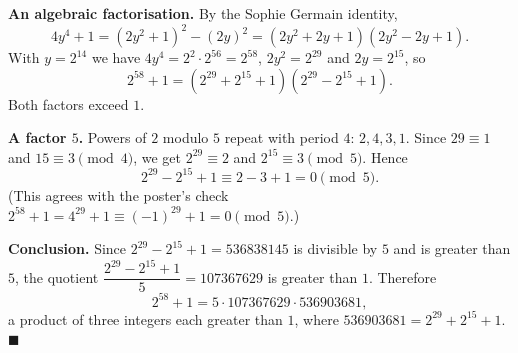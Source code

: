 \textbf{An algebraic factorisation.} By the Sophie Germain identity,
\[
4y^4+1=(2y^2+1)^2-(2y)^2=(2y^2+2y+1)(2y^2-2y+1).
\]
With $y=2^{14}$ we have $4y^4=2^{2}\cdot2^{56}=2^{58}$, $2y^2=2^{29}$ and $2y=2^{15}$, so
\[
2^{58}+1=\left(2^{29}+2^{15}+1\right)\left(2^{29}-2^{15}+1\right).
\]
Both factors exceed $1$.

\textbf{A factor $5$.} Powers of $2$ modulo $5$ repeat with period $4$: $2,4,3,1$. Since $29\equiv1$ and $15\equiv3\pmod4$, we get $2^{29}\equiv2$ and $2^{15}\equiv3\pmod5$. Hence
\[
2^{29}-2^{15}+1\equiv2-3+1=0\pmod5 .
\]
(This agrees with the poster's check $2^{58}+1=4^{29}+1\equiv(-1)^{29}+1=0\pmod5$.)

\textbf{Conclusion.} Since $2^{29}-2^{15}+1=536838145$ is divisible by $5$ and is greater than $5$, the quotient $\dfrac{2^{29}-2^{15}+1}{5}=107367629$ is greater than $1$. Therefore
\[
2^{58}+1=5\cdot107367629\cdot536903681,
\]
a product of three integers each greater than $1$, where $536903681=2^{29}+2^{15}+1$. $\blacksquare$
